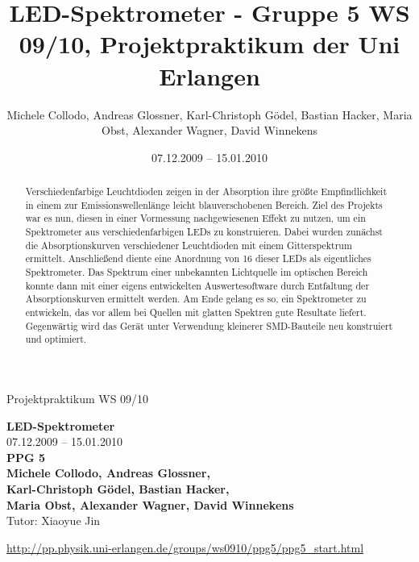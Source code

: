 \documentclass[11pt]{scrartcl}
\title{LED-Spektrometer - Gruppe 5 WS 09/10, Projektpraktikum der Uni Erlangen}
\date{07.12.2009 -- 15.01.2010}
\author{Michele Collodo, Andreas Glossner, Karl-Christoph G\"odel, Bastian Hacker, Maria Obst, Alexander Wagner, David Winnekens}
\begin{document}
\sloppy %
\thispagestyle{empty}
\large{Projektpraktikum WS 09/10}
\hfill
{}
\\[8\baselineskip]
\begin{center}
{\fontsize{36}{54}\textbf{LED-Spektrometer}}
\\[2\baselineskip]
{\Large 07.12.2009 -- 15.01.2010}
\\[7\baselineskip]
{\huge\textbf{PPG 5}}
\\[0.5\baselineskip]
{\large\textbf{
Michele Collodo,
Andreas Glossner,\\
Karl-Christoph G\"odel,
Bastian Hacker,\\
Maria Obst,
Alexander Wagner,
David Winnekens}\\
Tutor: Xiaoyue Jin}
\vfill



\small{\url{http://pp.physik.uni-erlangen.de/groups/ws0910/ppg5/ppg5\_start.html}}
\end{center}
\newpage



\tableofcontents
\vfill



\begin{abstract} %
Verschiedenfarbige Leuchtdioden zeigen in der Absorption ihre größte Empfindlichkeit in einem zur Emissionswellenlänge leicht blauverschobenen Bereich. Ziel des Projekts war es nun, diesen in einer Vormessung nachgewiesenen Effekt zu nutzen, um ein Spektrometer aus verschiedenfarbigen LEDs zu konstruieren. 
Dabei wurden zunächst die Absorptionskurven verschiedener Leuchtdioden mit einem Gitterspektrum ermittelt. Anschließend diente eine Anordnung von 16 dieser LEDs als eigentliches Spektrometer. Das Spektrum einer unbekannten Lichtquelle im optischen Bereich konnte dann mit einer eigens entwickelten Auswertesoftware durch Entfaltung der Absorptionskurven ermittelt werden. Am Ende gelang es so, ein Spektrometer zu entwickeln, das vor allem bei Quellen mit glatten Spektren gute Resultate liefert. Gegenwärtig wird das Gerät unter Verwendung kleinerer SMD-Bauteile neu konstruiert und optimiert. 
\end{abstract}
\newpage
\end{document}

